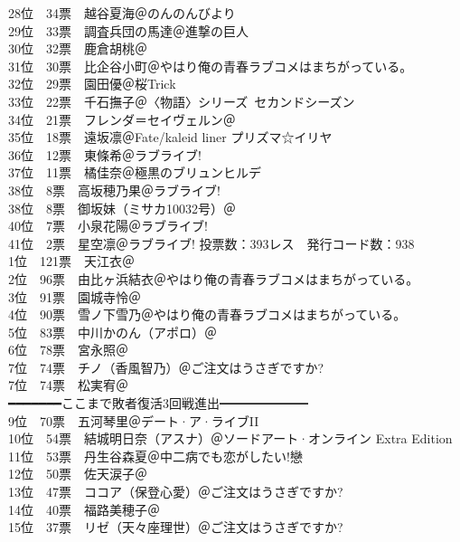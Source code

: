 {    28位　34票　越谷夏海＠のんのんびより\\
    29位　33票　調査兵団の馬達＠進撃の巨人\\
    30位　32票　鹿倉胡桃＠\Saki\\
    31位　30票　比企谷小町＠やはり俺の青春ラブコメはまちがっている。\\
    32位　29票　園田優＠桜Trick\\
    33位　22票　千石撫子＠〈物語〉シリーズ~セカンドシーズン\\
    34位　21票　フレンダ＝セイヴェルン＠\Railgan\\
    35位　18票　遠坂凛＠Fate/kaleid liner プリズマ☆イリヤ\\
    36位　12票　東條希＠ラブライブ!\\
    37位　11票　橘佳奈＠極黒のブリュンヒルデ\\
    38位　8票　高坂穂乃果＠ラブライブ!\\
    38位　8票　御坂妹（ミサカ10032号）＠\Railgan\\
    40位　7票　小泉花陽＠ラブライブ!\\
    41位　2票　星空凛＠ラブライブ!
}{
    投票数：393レス　発行コード数：938\\
    1位　121票　天江衣＠\Saki\\
    2位　96票　由比ヶ浜結衣＠やはり俺の青春ラブコメはまちがっている。\\
    3位　91票　園城寺怜＠\Saki\\
    4位　90票　雪ノ下雪乃＠やはり俺の青春ラブコメはまちがっている。\\
    5位　83票　中川かのん（アポロ）＠\Kaminomi\\
    6位　78票　宮永照＠\Saki\\
    7位　74票　チノ（香風智乃）＠ご注文はうさぎですか?\\
    7位　74票　松実宥＠\Saki\\
    ━━━━━━━ここまで敗者復活3回戦進出━━━━━━━\\
    9位　70票　五河琴里＠デート·ア·ライブII\\
    10位　54票　結城明日奈（アスナ）＠ソードアート·オンライン Extra Edition\\
    11位　53票　丹生谷森夏＠中二病でも恋がしたい!戀\\
    12位　50票　佐天涙子＠\Railgan\\
    13位　47票　ココア（保登心愛）＠ご注文はうさぎですか?\\
    14位　40票　福路美穂子＠\Saki\\
    15位　37票　リゼ（天々座理世）＠ご注文はうさぎですか?\\
}
